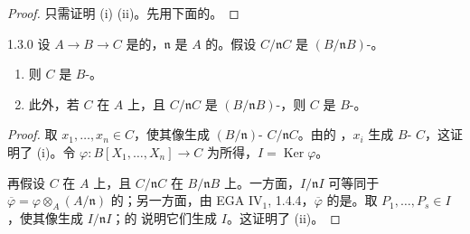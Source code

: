 \begin{proof}
只需证明 (i)  (ii)。先用下面的。
\end{proof}
\begin{SGAresult}{}{1.3.0}
设 $A\to B\to C$ 是的，$\mathfrak n$ 是 $A$ 的。假设 $C/\mathfrak n C$ 是 $(B/\mathfrak n B)$-。
\begin{enumerate}
\item[(i)] 则 $C$ 是 $B$-。
\item[(ii)] 此外，若 $C$ 在 $A$ 上，且 $C/\mathfrak n C$ 是 $(B/\mathfrak n B)$-，则 $C$ 是 $B$-。
\end{enumerate}
\end{SGAresult}
\begin{proof}
取 $x_1,\ldots,x_n\in C$，使其像生成 $(B/\mathfrak n)$- $C/\mathfrak n C$。由的 ，$x_i$ 生成 $B$- $C$，这证明了 (i)。令 $\varphi:B[X_1,\ldots,X_n]\to C$ 为所得，$I=\operatorname{Ker}\varphi$。

再假设 $C$ 在 $A$ 上，且 $C/\mathfrak n C$ 在 $B/\mathfrak n B$ 上。一方面，$I/\mathfrak n I$ 可等同于 $\overline\varphi=\varphi\otimes_A(A/\mathfrak n)$ 的；另一方面，由 EGA IV$_1$, 1.4.4，$\overline\varphi$ 的是。取 $P_1,\ldots,P_s\in I$，使其像生成 $I/\mathfrak n I$；的 说明它们生成 $I$。这证明了 (ii)。
\end{proof}
